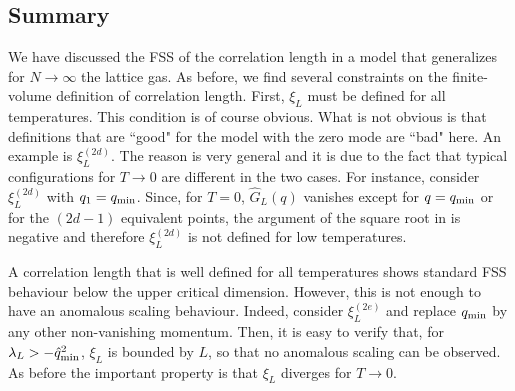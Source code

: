 \documentclass[12pt]{article}
\begin{document}


\subsection{Summary}

We have discussed the FSS of the correlation length in a model that 
generalizes for $N\to\infty$ the lattice gas. As before, we find 
several constraints on the finite-volume definition of 
correlation length. First, $\xi_L$ must be defined for all 
temperatures. This condition is of course obvious. What is not obvious 
is that definitions that are ``good" for the model with the zero 
mode are ``bad" here. An example is $\xi_L^{(2d)}$. 
The reason is very general and it is due to the fact that typical 
configurations for $T\to 0$ are different in the two cases. 
For instance, consider $\xi_L^{(2d)}$ with $q_1 = q_{\rm min}$. 
Since, for $T=0$,  $\widehat{G}_L(q)$ 
vanishes except for $q=q_{\rm min}$ or for the $(2d-1)$ equivalent
points, the argument of the square root in  is negative  
 and therefore  $\xi_L^{(2d)}$ is not defined for low temperatures.

A correlation length that is well defined for all temperatures 
shows standard FSS behaviour below the upper critical dimension. 
However, this is not enough to have an anomalous scaling behaviour. 
Indeed, consider $\xi_L^{(2e)}$ and replace $q_{\rm min}$ by any other 
non-vanishing momentum. Then, it is easy to verify that, 
for $\lambda_L > -\hat{q}_{\rm min}^2$, $\xi_L$ is bounded by $L$, so that 
no anomalous scaling can be observed. As before the important property is 
that $\xi_L$ diverges for $T\to 0$. 
\end{document}
